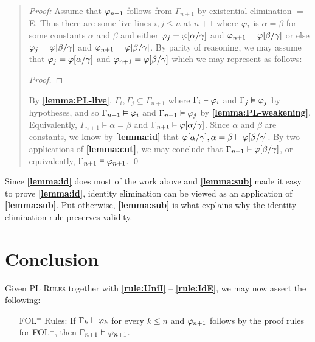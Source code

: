 \begin{quote} 
  \textit{Proof:} Assume that $\varphi_{n+1}$ follows from $\Gamma_{n+1}$ by existential elimination $=$E.
  Thus there are some live lines $i,j\leq n$ at $n+1$ where $\varphi_i$ is $\alpha=\beta$ for some constants $\alpha$ and $\beta$ and either $\varphi_j=\varphi[\alpha/\gamma]$ and $\varphi_{n+1}=\varphi[\beta/\gamma]$ or else $\varphi_j=\varphi[\beta/\gamma]$ and $\varphi_{n+1}=\varphi[\beta/\gamma]$.
  By parity of reasoning, we may assume that $\varphi_j=\varphi[\alpha/\gamma]$ and $\varphi_{n+1}=\varphi[\beta/\gamma]$ which we may represent as follows:

  \begin{proof}
     
  \end{proof}

  By \textbf{\ref{lemma:PL-live}}, $\Gamma_i,\Gamma_j\subseteq \Gamma_{n+1}$ where $\Gamma_i\vDash\varphi_i$ and $\Gamma_j\vDash\varphi_j$ by hypotheses, and so $\Gamma_{n+1} \vDash \varphi_i$ and $\Gamma_{n+1} \vDash \varphi_j$ by \textbf{\ref{lemma:PL-weakening}}.
  Equivalently, $\Gamma_{n+1} \vDash \alpha = \beta$ and $\Gamma_{n+1} \vDash \varphi[\alpha/\gamma]$.
  Since $\alpha$ and $\beta$ are constants, we know by \textbf{\ref{lemma:id}} that $\varphi[\alpha/\gamma], \alpha = \beta \vDash \varphi[\beta/\gamma]$.
  By two applications of \textbf{\ref{lemma:cut}}, we may conclude that $\Gamma_{n+1}\vDash\varphi[\beta/\gamma]$, or equivalently, $\Gamma_{n+1}\vDash\varphi_{n+1}$.
  \qed
\end{quote}


Since \textbf{\ref{lemma:id}} does most of the work above and \textbf{\ref{lemma:sub}} made it easy to prove \textbf{\ref{lemma:id}}, identity elimination can be viewed as an application of \textbf{\ref{lemma:sub}}.
Put otherwise, \textbf{\ref{lemma:sub}} is what explains why the identity elimination rule preserves validity.


\section{Conclusion}%
  \label{sec:Conclusion}

Given \textsc{PL Rules} together with \textbf{\ref{rule:UniI}} -- \textbf{\ref{rule:IdE}}, we may now assert the following:

\begin{enumerate}[leftmargin=1.3in]
  \item[\sc FOL$^=$ Rules:] If $\Gamma_k \vDash \varphi_k$ for every $k\leq n$ and $\varphi_{n+1}$ follows by the proof rules for FOL$^=$, then $\Gamma_{n+1} \vDash \varphi_{n+1}$.
\end{enumerate}

